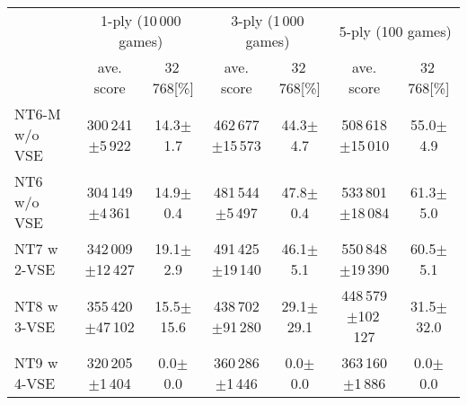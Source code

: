 \documentclass[runningheads]{llncs}
\begin{document}
 \setlength{\doublerulesep}{.4pt}
 \small\begin{tabular}{l|c|c|c|c|c|c}
  \hline \hline
  & \multicolumn{2}{c|}{1-ply (10\,000 games)} & \multicolumn{2}{c|}{3-ply (1\,000 games)} & \multicolumn{2}{c}{5-ply (100 games)} \\
  & \multicolumn{1}{c}{ave. score} & 32\,768[\%] & \multicolumn{1}{c}{ave. score} & 32\,768[\%] & \multicolumn{1}{c}{ave. score} & 32\,768[\%] \\
  \hline
   \textsf{NT6-M} w/o VSE	& 300\,241$\pm$\phantom{0}5\,922	& 14.3$\pm$\phantom{0}1.7		& 462\,677$\pm$15\,573			& 44.3$\pm$\phantom{0}4.7		& 508\,618$\pm$\phantom{0}15\,010	& 55.0$\pm$\phantom{0}4.9 \\ \hline
   \textsf{NT6} w/o VSE		& 304\,149$\pm$\phantom{0}4\,361	& 14.9$\pm$\phantom{0}0.4		& 481\,544$\pm$\phantom{0}5\,497	& 47.8$\pm$\phantom{0}0.4		& 533\,801$\pm$\phantom{0}18\,084	& 61.3$\pm$\phantom{0}5.0 \\ \hline
   \textsf{NT7} w 2-VSE		& 342\,009$\pm$12\,427			& 19.1$\pm$\phantom{0}2.9		& 491\,425$\pm$19\,140			& 46.1$\pm$\phantom{0}5.1		& 550\,848$\pm$\phantom{0}19\,390	& 60.5$\pm$\phantom{0}5.1 \\\hline
   \textsf{NT8} w 3-VSE		& 355\,420$\pm$47\,102			& 15.5$\pm$15.6				& 438\,702$\pm$91\,280			& 29.1$\pm$29.1				& 448\,579$\pm$102\,127		    	& 31.5$\pm$32.0 \\\hline
   \textsf{NT9} w 4-VSE		& 320\,205$\pm$\phantom{0}1\,404	& \phantom{0}0.0$\pm$\phantom{0}0.0	& 360\,286$\pm$\phantom{0}1\,446	& \phantom{0}0.0$\pm$\phantom{0}0.0	& 363\,160$\pm$\phantom{00}1\,886	& \phantom{0}0.0$\pm$\phantom{0}0.0 \\\hline
 \end{tabular}
\end{document}
